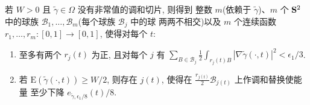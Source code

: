 \begin{lemma}
\label{lem:5.25}
若 $W>0$ 且 $\tilde{\gamma}\in\Omega$ 没有非常值的调和切片, 则得到
整数 $m$(依赖于 $\tilde{\gamma}$)、$m$ 个 $\mathbf{S}^2$ 中的球族
$\mathcal{B}_1,\dots,\mathcal{B}_m$(每个球族 $\mathcal{B}_j$ 中的球
两两不相交)以及 $m$ 个连续函数
$r_1,\dots,r_m:[0,1]\to[0,1]$, 使得对每个 $t$:

\begin{enumerate}
\item 至多有两个 $r_j(t)$ 为正, 且对每个 $j$ 有
      $\sum_{B\in\mathcal{B}_j}\frac12\int_{r_j(t)B}
      |\nabla\tilde{\gamma}(\cdot,t)|^2<\epsilon_1/3$.
\item {\setlength{\emergencystretch}{2em}%
      若 $\mathrm{E}(\tilde{\gamma}(\cdot,t))\geq W/2$, 则存在 $j(t)$,
      使得在 $\frac{r_{j(t)}}2\mathcal{B}_{j(t)}$ 上作调和替换使能量
      至少下降 $e_{\tilde{\gamma},\epsilon_1/8}(t)/8$.\par}
\end{enumerate}
\end{lemma}

